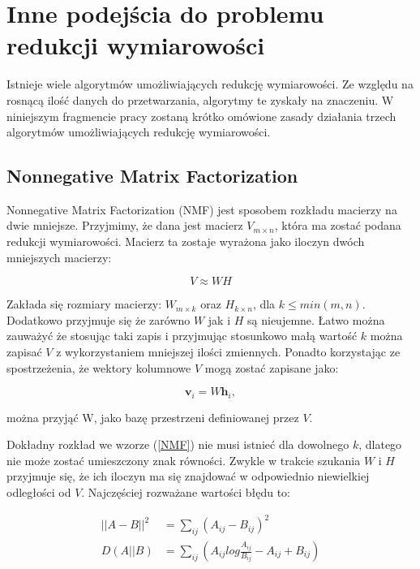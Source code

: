 \documentclass[oneside, eng]{mgr}
\newcommand{\bb}{\textbf}
\begin{document}
\section{Inne podejścia do problemu redukcji wymiarowości}
Istnieje wiele algorytmów umożliwiających redukcję wymiarowości. Ze względu na rosnącą ilość danych do przetwarzania, algorytmy te zyskały na znaczeniu. W niniejszym fragmencie pracy zostaną krótko omówione zasady działania trzech algorytmów umożliwiających redukcję wymiarowości.

\subsection{Nonnegative Matrix Factorization}

Nonnegative Matrix Factorization (NMF) jest sposobem rozkładu macierzy na dwie mniejsze. Przyjmimy, że dana jest macierz $V_{m \times n}$, która ma zostać podana redukcji wymiarowości. Macierz ta zostaje wyrażona jako iloczyn dwóch mniejszych macierzy:

\begin{equation}
	V \approx WH
\label{NMF}
\end{equation}

Zakłada się rozmiary macierzy: $W_{m \times k}$ oraz $H_{k \times n}$, dla $k \leq min(m,n)$. Dodatkowo przyjmuje się że zarówno $W$ jak i $H$ są nieujemne. Łatwo można zauważyć że stosując taki zapis i przyjmując stosunkowo małą wartość $k$ można zapisać $V$ z wykorzystaniem mniejszej ilości zmiennych. Ponadto korzystając ze spostrzeżenia, że wektory kolumnowe $V$ mogą zostać zapisane jako:

\begin{equation}
	\bb{v}_i = W \bb{h}_i,
\end{equation}

można przyjąć W, jako bazę przestrzeni definiowanej przez $V$.

Dokładny rozkład we wzorze (\ref{NMF}) nie musi istnieć dla dowolnego $k$, dlatego nie może zostać umieszczony znak równości. Zwykle w trakcie szukania $W$ i $H$ przyjmuje się, że ich iloczyn ma się znajdować w odpowiednio niewielkiej odległości od $V$. Najczęściej rozważane wartości błędu to:

\begin{align*}
	||A - B||^2 &= \sum_{ij} (A_{ij} - B_{ij})^2 \\
	  D(A||B)   &= \sum_{ij} (A_{ij} log \frac{A_{ij}}{B_{ij}} - A_{ij} + B_{ij})
\end{align*}
\end{document}
